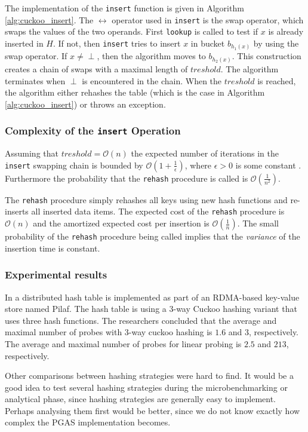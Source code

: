 The implementation of the \texttt{insert} function is given in Algorithm \ref{alg:cuckoo_insert}. The $\leftrightarrow$ operator used in \texttt{insert} is the swap operator, which swaps the values of the two operands. First \texttt{lookup} is called to test if $x$ is already inserted in $H$. If not, then \texttt{insert} tries to insert $x$ in bucket $b_{h_1(x)}$ by using the swap operator. If $x \not = \perp$, then the algorithm moves to $b_{h_2(x)}$. This construction creates a chain of swaps with a maximal length of $treshold$. The algorithm terminates when $\perp$ is encountered in the chain. When the $treshold$ is reached, the algorithm either rehashes the table (which is the case in Algorithm \ref{alg:cuckoo_insert}) or throws an exception.

\subsubsection{Complexity of the \texttt{insert} Operation}
Assuming that $treshold = \mathcal{O}(n)$ the expected number of iterations in the \texttt{insert} swapping chain is bounded by $\mathcal{O}(1 + \frac{1}{\epsilon})$, where $\epsilon > 0$ is some constant \cite{Pagh:2004:CH:1006424.1006426}. Furthermore the probability that the \texttt{rehash} procedure is called is $\mathcal{O}(\frac{1}{n^2})$.

The \texttt{rehash} procedure simply rehashes all keys using new hash functions and re-inserts all inserted data items. The expected cost of the \texttt{rehash} procedure is $\mathcal{O}(n)$ and the amortized expected cost per insertion is $\mathcal{O}(\frac{1}{n})$. The small probability of the \texttt{rehash} procedure being called implies that the \emph{variance} of the insertion time is constant.

\subsubsection{Experimental results}
In \cite{pilaf} a distributed hash table is implemented as part of an RDMA-based key-value store named Pilaf. The hash table is using a 3-way Cuckoo hashing variant that uses three hash functions. The researchers concluded that the average and maximal number of probes with 3-way cuckoo hashing is $1.6$ and $3$, respectively. The average and maximal number of probes for linear probing is $2.5$ and $213$, respectively. 

Other comparisons between hashing strategies were hard to find. It would be a good idea to test several hashing strategies during the microbenchmarking or analytical phase, since hashing strategies are generally easy to implement. Perhaps analysing them first would be better, since we do not know exactly how complex the PGAS implementation becomes. 

